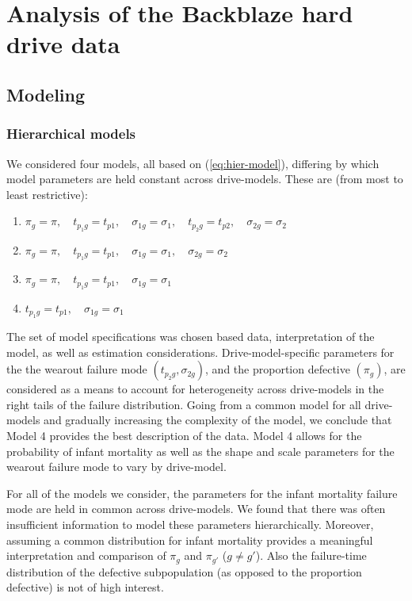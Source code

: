 \documentclass[12pt]{article}
\begin{document}
\section{Analysis of the Backblaze hard drive data}
\label{sec:Data analysis}
\subsection{Modeling}
\subsubsection{Hierarchical models}
We considered four models, all based on (\ref{eq:hier-model}), differing by which model parameters are held constant across drive-models. These are (from most to least restrictive):

\begin{enumerate}
\item $\pi_{g} = \pi,\quad t_{p_{1}g} = t_{p1},\quad \sigma_{1g}=\sigma_1,\quad t_{p_{2}g} = t_{p2},\quad \sigma_{2g} = \sigma_2$
\item $\pi_{g} = \pi,\quad t_{p_{1}g} = t_{p1},\quad \sigma_{1g}=\sigma_1,\quad \sigma_{2g} = \sigma_2$
\item $\pi_{g} = \pi,\quad  t_{p_{1}g}= t_{p1},\quad \sigma_{1g}=\sigma_1$
\item $t_{p_{1}g}= t_{p1},\quad \sigma_{1g}=\sigma_1$
\end{enumerate}

The set of model specifications was chosen based data, interpretation of the model, as well as estimation considerations.  Drive-model-specific parameters for the the wearout failure mode $(t_{p_{2}g},\sigma_{2g})$, and the proportion defective $(\pi_g)$, are considered as a means to account for heterogeneity across drive-models in the right tails of the failure distribution.  Going from a common model for all drive-models and gradually increasing the complexity of the model, we conclude that Model 4 provides the best description of the data.  Model 4 allows for the probability of infant mortality as well as the shape and scale parameters for the wearout failure mode to vary by drive-model.

For all of the models we consider, the parameters for the infant mortality failure mode are held in common across drive-models.  We found that there was often insufficient information to model these parameters hierarchically.  Moreover, assuming a common distribution for infant mortality provides a meaningful interpretation and comparison of $\pi_g$ and $\pi_{g'}$ ($g \neq g'$). Also the failure-time distribution of the defective subpopulation (as opposed to the proportion defective) is not of high interest.
\end{document}
